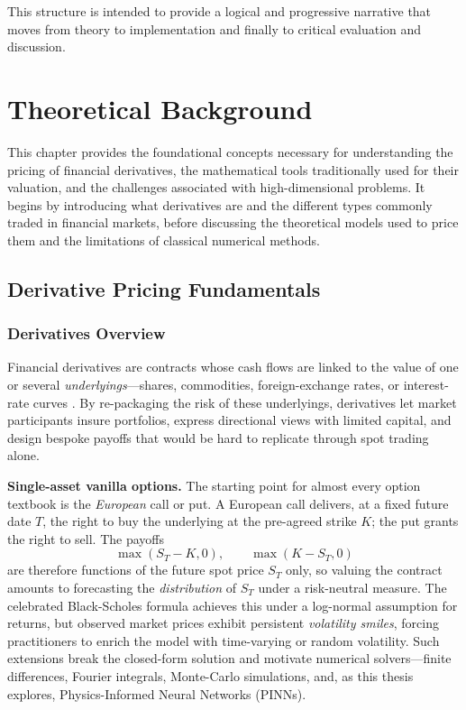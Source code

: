 \documentclass[12pt]{report} %
\theoremstyle{plain}           %
\theoremstyle{definition}      %
\theoremstyle{remark}          %
\begin{document}
This structure is intended to provide a logical and progressive narrative that moves from theory to 
implementation and finally to critical evaluation and discussion.

\chapter{Theoretical Background}
This chapter provides the foundational concepts necessary for understanding the pricing of financial 
derivatives, the mathematical tools traditionally used for their valuation, and the challenges 
associated with high-dimensional problems. It begins by introducing what derivatives are and the 
different types commonly traded in financial markets, before discussing the theoretical models used 
to price them and the limitations of classical numerical methods.

\section{Derivative Pricing Fundamentals}

\subsection{Derivatives Overview}\label{sec:derivatives_overview}

Financial derivatives are contracts whose cash flows are linked to the value of one or several
\emph{underlyings}—shares, commodities, foreign-exchange rates, or interest-rate curves
\cite{alma99148840908702021,Wilmott2010PaulWO}.  
By re-packaging the risk of these underlyings, derivatives let market participants
insure portfolios, express directional views with limited capital, and design bespoke payoffs
that would be hard to replicate through spot trading alone.

\medskip
\noindent\textbf{Single-asset vanilla options.}
The starting point for almost every option textbook is the \emph{European} call or put.
A European call delivers, at a fixed future date \(T\), the right to buy the underlying at the
pre-agreed strike \(K\); the put grants the right to sell. The payoffs
\[
\max(S_T-K,0),\qquad \max(K-S_T,0)
\]
are therefore functions of the future spot price \(S_T\) only, so valuing the contract amounts
to forecasting the \emph{distribution} of \(S_T\) under a risk-neutral measure. The celebrated
Black-Scholes formula achieves this under a log-normal assumption for returns, but observed
market prices exhibit persistent \emph{volatility smiles}, forcing practitioners to enrich the
model with time-varying or random volatility. Such extensions break the closed-form solution
and motivate numerical solvers—finite differences, Fourier integrals, Monte-Carlo simulations,
and, as this thesis explores, Physics-Informed Neural Networks (PINNs).
\end{document}
